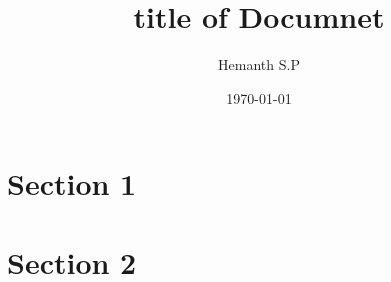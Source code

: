 \documentclass{article}
\begin{document}
\title{title of Documnet}
\author{Hemanth S.P}
\date{\today}
\maketitle
\thispagestyle{fancy}
\section{Section 1}
\lipsum[1]
\section{Section 2}
\lipsum[2]
\end{document}
